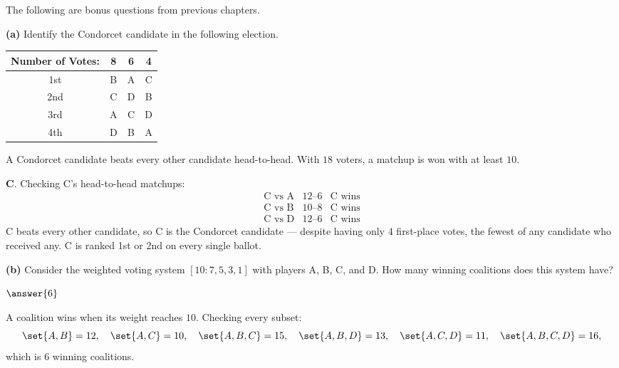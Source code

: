 \documentclass[12pt]{ximera}
\begin{document}
\begin{problem}
The following are bonus questions from previous chapters.

\begin{prompt}
\textbf{(a)} Identify the Condorcet candidate in the following election.

\begin{center}
\begin{tabular}{c|ccc}
Number of Votes: & 8 & 6 & 4 \\\hline
1st & B & A & C \\
2nd & C & D & B \\
3rd & A & C & D \\
4th & D & B & A
\end{tabular}
\end{center}

\begin{multipleChoice}
\end{multipleChoice}

\begin{hint}
A Condorcet candidate beats every other candidate head-to-head. With $18$ voters, a
matchup is won with at least $10$.
\end{hint}

\begin{feedback}
\textbf{C}. Checking C's head-to-head matchups:
\[
\begin{array}{lll}
\text{C vs A} & 12\text{--}6 & \text{C wins}\\
\text{C vs B} & 10\text{--}8 & \text{C wins}\\
\text{C vs D} & 12\text{--}6 & \text{C wins}
\end{array}
\]
C beats every other candidate, so C is the Condorcet candidate --- despite having only
$4$ first-place votes, the fewest of any candidate who received any. C is ranked 1st or
2nd on every single ballot.
\end{feedback}
\end{prompt}

\begin{prompt}
\textbf{(b)} Consider the weighted voting system $[10:7,5,3,1]$ with players A, B, C,
and D. How many winning coalitions does this system have?

$\answer{6}$

\begin{feedback}
A coalition wins when its weight reaches $10$. Checking every subset:
\[
\set{A,B}=12, \quad \set{A,C}=10, \quad \set{A,B,C}=15, \quad \set{A,B,D}=13,
\quad \set{A,C,D}=11, \quad \set{A,B,C,D}=16,
\]
which is $6$ winning coalitions.


\end{feedback}
\end{prompt}
\end{problem}
\end{document}
